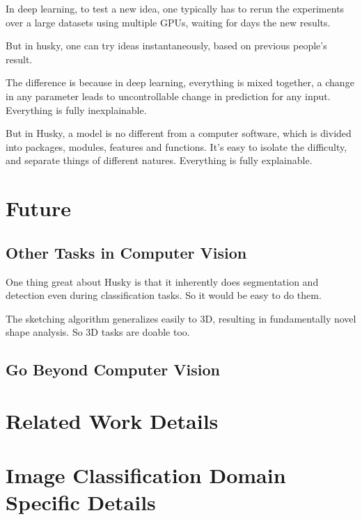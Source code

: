 \documentclass[11pt]{article} 	%
\theoremstyle{definition}
\begin{document}
In deep learning, to test a new idea, one typically has to rerun the experiments over a large datasets using multiple GPUs, waiting for days the new results.

But in husky, one can try ideas instantaneously, based on previous people's result.

The difference is because in deep learning, everything is mixed together, a change in any parameter leads to uncontrollable change in prediction for any input. Everything is fully inexplainable.

But in Husky, a model is no different from a computer software, which is divided into packages, modules, features and functions. It's easy to isolate the difficulty, and separate things of different natures. Everything is fully explainable.

\subsection{}


\section{Future}

\subsection{Other Tasks in Computer Vision}

One thing great about Husky is that it inherently does segmentation and detection even during classification tasks. So it would be easy to do them.

The sketching algorithm generalizes easily to 3D, resulting in fundamentally novel shape analysis. So 3D tasks are doable too.

\subsection{Go Beyond Computer Vision}

\appendix

\section{Related Work Details}

\section{Image Classification Domain Specific Details}
\end{document}
